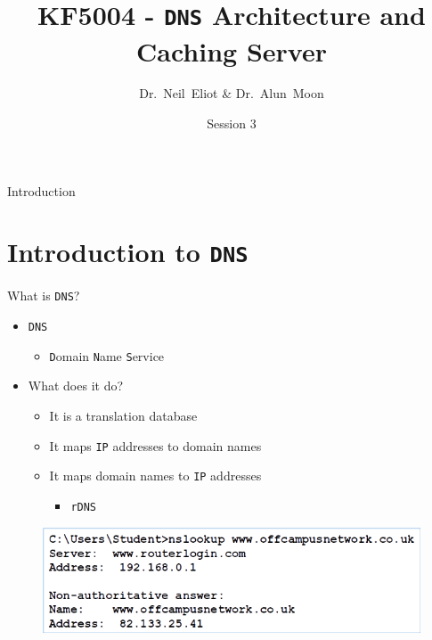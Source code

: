\documentclass[aspectratio=169]{beamer}
\title{KF5004 - \texttt{DNS} Architecture and Caching Server}
\author{Dr.~Neil~Eliot \& Dr.~Alun~Moon}
\institute[Northumbria University] %
{
  Department of Computer and Information Sciences\\
  University of Northumbria
}
\date{Session 3}
\begin{document}
\begin{frame}
  \titlepage
\end{frame}

\begin{frame}{Introduction}
  \tableofcontents
\end{frame}


\section{Introduction to \texttt{DNS}}
\begin{frame}{What is \texttt{DNS}?}
  \begin{itemize}
    \item \texttt{DNS}
      \begin{itemize}
          \item \texttt{D}omain \texttt{N}ame \texttt{S}ervice
      \end{itemize}
    \item What does it do?   
      \begin{itemize}
        \item It is a translation database
        \item It maps \texttt{IP} addresses to domain names
        \item It maps domain names to \texttt{IP} addresses
          \begin{itemize}
            \item \texttt{rDNS}
          \end{itemize}
      \end{itemize} 
  \end{itemize}
  \begin{figure}
    \begin{center}
      \includegraphics[width=0.8\linewidth]{nslookup.png}
    \end{center}
  \end{figure}
\end{frame}
\end{document}
